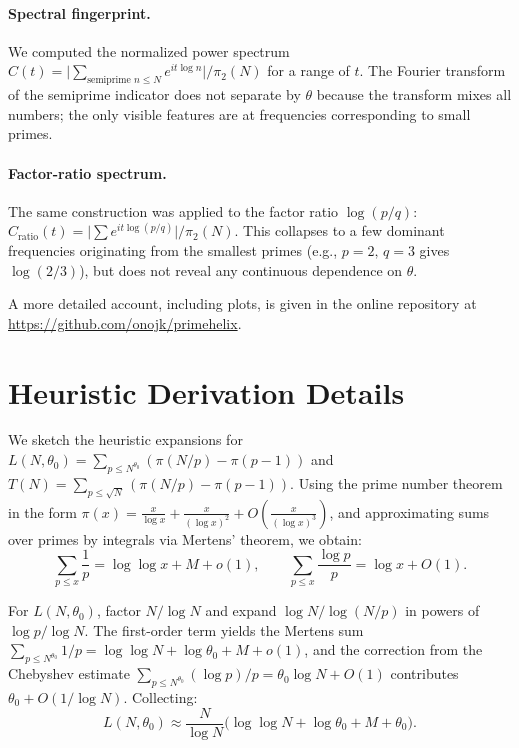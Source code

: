 \documentclass[11pt]{article}
\theoremstyle{definition}
\begin{document}
\paragraph{Spectral fingerprint.}
We computed the normalized power spectrum
\(C(t) = \bigl|\sum_{\text{semiprime }n\le N} e^{it\log n}\bigr| / \pi_2(N)\)
for a range of \(t\).  The Fourier transform of the semiprime indicator does not
separate by \(\theta\) because the transform mixes all numbers; the only visible
features are at frequencies corresponding to small primes.

\paragraph{Factor-ratio spectrum.}
The same construction was applied to the factor ratio \(\log(p/q)\):
\(C_{\mathrm{ratio}}(t) = \bigl|\sum e^{it\log(p/q)}\bigr| / \pi_2(N)\).  This
collapses to a few dominant frequencies originating from the smallest primes
(e.g., \(p=2,\,q=3\) gives \(\log(2/3)\)), but does not reveal any continuous
dependence on \(\theta\).

A more detailed account, including plots, is given in the online repository at
\url{https://github.com/onojk/primehelix}.

\section{Heuristic Derivation Details}
\label{app:heuristic-derivation}

We sketch the heuristic expansions for
\(L(N,\theta_0) = \sum_{p \le N^{\theta_0}} (\pi(N/p) - \pi(p-1))\) and
\(T(N) = \sum_{p \le \sqrt{N}} (\pi(N/p) - \pi(p-1))\).  Using the prime number theorem
in the form \(\pi(x) = \frac{x}{\log x} + \frac{x}{(\log x)^2} + O\!\left(\frac{x}{(\log x)^3}\right)\),
and approximating sums over primes by integrals via Mertens' theorem, we obtain:
\[
\sum_{p \le x} \frac{1}{p} = \log\log x + M + o(1), \qquad
\sum_{p \le x} \frac{\log p}{p} = \log x + O(1).
\]

For \(L(N,\theta_0)\), factor \(N/\log N\) and expand \(\log N / \log(N/p)\)
in powers of \(\log p / \log N\).  The first-order term yields the Mertens sum
\(\sum_{p \le N^{\theta_0}} 1/p = \log\log N + \log\theta_0 + M + o(1)\), and the
correction from the Chebyshev estimate \(\sum_{p \le N^{\theta_0}} (\log p)/p
= \theta_0 \log N + O(1)\) contributes \(\theta_0 + O(1/\log N)\).  Collecting:
\[
L(N,\theta_0) \approx \frac{N}{\log N}
\bigl(\log\log N + \log\theta_0 + M + \theta_0\bigr).
\]
\end{document}
